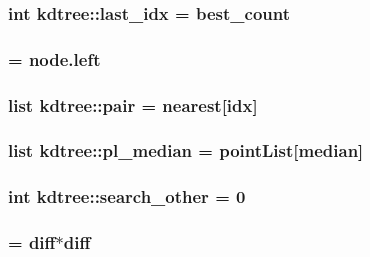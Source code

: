 \label{namespacekdtree_a8ae4f604fa3b331f0e1857ef7988dbed}
\hypertarget{namespacekdtree_a0e2b4f0710247ad4a1bc44217b669f98}{
\subsubsection[{last\_\-idx}]{\setlength{\rightskip}{0pt plus 5cm}int {\bf kdtree::last\_\-idx} = {\bf best\_\-count}}}
\label{namespacekdtree_a0e2b4f0710247ad4a1bc44217b669f98}
\hypertarget{namespacekdtree_a0ba21301aea56f1c2ef165f16bcc6af6}{
\subsubsection[{near}]{ = node.left}}
\label{namespacekdtree_a0ba21301aea56f1c2ef165f16bcc6af6}
\hypertarget{namespacekdtree_a2c9210668756589c874996518e7c43dc}{
\subsubsection[{pair}]{\setlength{\rightskip}{0pt plus 5cm}list {\bf kdtree::pair} = nearest\mbox{[}idx\mbox{]}}}
\label{namespacekdtree_a2c9210668756589c874996518e7c43dc}
\hypertarget{namespacekdtree_a68dd1b5c2ca51036f48cfb773ef665ac}{
\subsubsection[{pl\_\-median}]{\setlength{\rightskip}{0pt plus 5cm}list {\bf kdtree::pl\_\-median} = pointList\mbox{[}median\mbox{]}}}
\label{namespacekdtree_a68dd1b5c2ca51036f48cfb773ef665ac}
\hypertarget{namespacekdtree_a697ad02b362c4958d0497573757a329a}{
\subsubsection[{search\_\-other}]{\setlength{\rightskip}{0pt plus 5cm}int {\bf kdtree::search\_\-other} = 0}}
\label{namespacekdtree_a697ad02b362c4958d0497573757a329a}
\hypertarget{namespacekdtree_aa6b03574baf9af70ad70c383f1276f53}{
\subsubsection[{sq\_\-diff}]{ = {\bf diff}$\ast${\bf diff}}}
\label{namespacekdtree_aa6b03574baf9af70ad70c383f1276f53}
